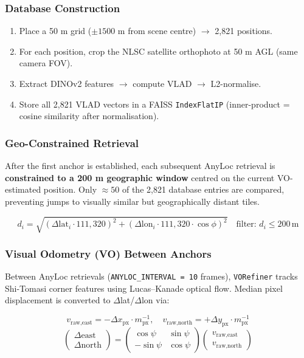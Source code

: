 \documentclass[11pt,a4paper]{article}
\begin{document}
\subsubsection*{Database Construction}

\begin{enumerate}
  \item Place a 50 m grid ($\pm1500$ m from scene centre) \ensuremath{\to} 2,821 positions.
  \item For each position, crop the NLSC satellite orthophoto at 50 m AGL (same camera FOV).
  \item Extract DINOv2 features \ensuremath{\to} compute VLAD \ensuremath{\to} L2-normalise.
  \item Store all 2,821 VLAD vectors in a FAISS \texttt{IndexFlatIP} (inner-product = cosine similarity after normalisation).
\end{enumerate}

\subsubsection*{Geo-Constrained Retrieval}

After the first anchor is established, each subsequent AnyLoc retrieval is
\textbf{constrained to a 200 m geographic window} centred on the current VO-estimated position.
Only $\approx 50$ of the 2,821 database entries are compared, preventing jumps to
visually similar but geographically distant tiles.

\[
  d_i = \sqrt{(\Delta\text{lat}_i \cdot 111{,}320)^2 + (\Delta\text{lon}_i \cdot 111{,}320 \cdot \cos\phi)^2}
  \quad \text{filter: } d_i \leq 200\,\text{m}
\]

\subsubsection*{Visual Odometry (VO) Between Anchors}

Between AnyLoc retrievals (\texttt{ANYLOC\_INTERVAL = 10} frames), \texttt{VORefiner} tracks
Shi-Tomasi corner features using Lucas--Kanade optical flow.  Median pixel displacement
is converted to $\Delta$lat/$\Delta$lon via:

\[
  v_\text{raw,east}  = -\Delta x_\text{px} \cdot m_\text{px}^{-1},
  \quad
  v_\text{raw,north} = +\Delta y_\text{px} \cdot m_\text{px}^{-1}
\]
\[
  \begin{pmatrix}\Delta\text{east}\\\Delta\text{north}\end{pmatrix}
  =
  \begin{pmatrix}\cos\psi & \sin\psi \\ -\sin\psi & \cos\psi\end{pmatrix}
  \begin{pmatrix}v_\text{raw,east}\\v_\text{raw,north}\end{pmatrix}
\]
\end{document}
